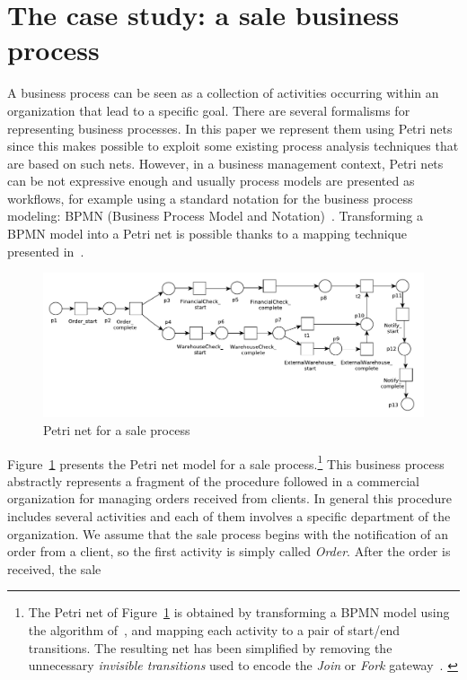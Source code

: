 \documentclass{llncs}
\begin{document}
\section{The case study: a sale business process}\label{example}
A business process can be seen as a collection of activities occurring within an organization that lead to a specific goal. There are several formalisms for representing business processes. In this paper we represent them using Petri nets~\cite{DBLP:conf/ifip/Petri62,DBLP:journals/jcsc/Aalst98} since this makes possible to exploit some existing process analysis techniques that are based on such nets. However, in a business management context, Petri nets can be not expressive enough and usually process models are presented as workflows, for example using a standard notation for the business process modeling: BPMN (Business Process Model and Notation)~\cite{BPMN}. Transforming a BPMN model into a Petri net is possible thanks to a mapping technique presented in~\cite{DBLP:conf/wsfm/BruniCFFGS11}.
\begin{figure}[h]
\includegraphics[width=360pt]
{./items/Sales_PN.pdf}
\caption{Petri net for a sale process}
\label{pnet}
\end{figure}
%
Figure~\ref{pnet} presents the Petri net model for a sale
process.\footnote{\small{
The Petri net of Figure~\ref{pnet} is obtained by
transforming a BPMN model using the algorithm of~\cite{DBLP:conf/wsfm/BruniCFFGS11}, and mapping
each activity to a pair of start/end transitions. The resulting net
has been simplified by removing the unnecessary \emph{invisible
  transitions} used to encode the \emph{Join} or \emph{Fork} gateway~\cite{DBLP:conf/wsfm/BruniCFFGS11}.
}} 
This business process abstractly represents a fragment of the
procedure followed in a commercial organization for managing orders
received from clients. In general this procedure includes several
activities and each of them involves a specific department of the
organization. We assume that the sale process begins with the
notification of an order from a client, so the first activity is
simply called \emph{Order}. After the order is received, the sale
\end{document}
